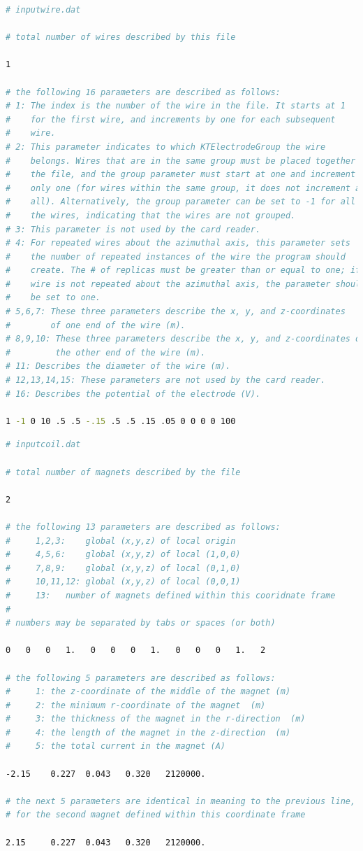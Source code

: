 \documentclass[11pt,a4paper,oneside]{article}
\begin{document}
\begin{lstlisting}[language=sh]
# inputwire.dat

# total number of wires described by this file

1

# the following 16 parameters are described as follows:
# 1: The index is the number of the wire in the file. It starts at 1
#    for the first wire, and increments by one for each subsequent
#    wire.
# 2: This parameter indicates to which KTElectrodeGroup the wire
#    belongs. Wires that are in the same group must be placed together in
#    the file, and the group parameter must start at one and increment by
#    only one (for wires within the same group, it does not increment at
#    all). Alternatively, the group parameter can be set to -1 for all of
#    the wires, indicating that the wires are not grouped.
# 3: This parameter is not used by the card reader.
# 4: For repeated wires about the azimuthal axis, this parameter sets
#    the number of repeated instances of the wire the program should
#    create. The # of replicas must be greater than or equal to one; if a
#    wire is not repeated about the azimuthal axis, the parameter should
#    be set to one.
# 5,6,7: These three parameters describe the x, y, and z-coordinates
#        of one end of the wire (m).
# 8,9,10: These three parameters describe the x, y, and z-coordinates of
#         the other end of the wire (m).
# 11: Describes the diameter of the wire (m).
# 12,13,14,15: These parameters are not used by the card reader.
# 16: Describes the potential of the electrode (V).

1 -1 0 10 .5 .5 -.15 .5 .5 .15 .05 0 0 0 0 100
\end{lstlisting}
%
\begin{lstlisting}[language=sh]
# inputcoil.dat

# total number of magnets described by the file

2

# the following 13 parameters are described as follows: 
#     1,2,3:	global (x,y,z) of local origin
#     4,5,6:	global (x,y,z) of local (1,0,0)
#     7,8,9:	global (x,y,z) of local (0,1,0)
#     10,11,12:	global (x,y,z) of local (0,0,1)
#     13:	number of magnets defined within this cooridnate frame
#
# numbers may be separated by tabs or spaces (or both)

0   0   0   1.   0   0   0   1.   0   0   0   1.   2

# the following 5 parameters are described as follows:
#     1: the z-coordinate of the middle of the magnet (m)
#     2: the minimum r-coordinate of the magnet  (m)
#     3: the thickness of the magnet in the r-direction  (m)
#     4: the length of the magnet in the z-direction  (m)
#     5: the total current in the magnet (A)

-2.15    0.227  0.043   0.320   2120000.

# the next 5 parameters are identical in meaning to the previous line,
# for the second magnet defined within this coordinate frame

2.15     0.227  0.043   0.320   2120000.
\end{lstlisting}
\end{document}
